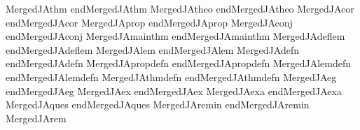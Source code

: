 \documentclass[12pt]{amsart}
\theoremstyle{definition}
\theoremstyle{remark}
\numberwithin{equation}{section}
\begin{document}
\newtheorem*{MergedJAclproof}{Proof of Claim}
\newtheorem*{MergedJAack}{Acknowledgements}



\expandafter\let\expandafter\thm\csname MergedJAthm\endcsname
\expandafter\let\expandafter\endthm\csname endMergedJAthm\endcsname
\expandafter\let\expandafter\theo\csname MergedJAtheo\endcsname
\expandafter\let\expandafter\endtheo\csname endMergedJAtheo\endcsname
\expandafter\let\expandafter\cor\csname MergedJAcor\endcsname
\expandafter\let\expandafter\endcor\csname endMergedJAcor\endcsname
\expandafter\let\expandafter\prop\csname MergedJAprop\endcsname
\expandafter\let\expandafter\endprop\csname endMergedJAprop\endcsname
\expandafter\let\expandafter\conj\csname MergedJAconj\endcsname
\expandafter\let\expandafter\endconj\csname endMergedJAconj\endcsname
\expandafter\let\expandafter\mainthm\csname MergedJAmainthm\endcsname
\expandafter\let\expandafter\endmainthm\csname endMergedJAmainthm\endcsname
\expandafter\let\expandafter\deflem\csname MergedJAdeflem\endcsname
\expandafter\let\expandafter\enddeflem\csname endMergedJAdeflem\endcsname
\expandafter\let\expandafter\lem\csname MergedJAlem\endcsname
\expandafter\let\expandafter\endlem\csname endMergedJAlem\endcsname
\expandafter\let\expandafter\defn\csname MergedJAdefn\endcsname
\expandafter\let\expandafter\enddefn\csname endMergedJAdefn\endcsname
\expandafter\let\expandafter\propdefn\csname MergedJApropdefn\endcsname
\expandafter\let\expandafter\endpropdefn\csname endMergedJApropdefn\endcsname
\expandafter\let\expandafter\lemdefn\csname MergedJAlemdefn\endcsname
\expandafter\let\expandafter\endlemdefn\csname endMergedJAlemdefn\endcsname
\expandafter\let\expandafter\thmdefn\csname MergedJAthmdefn\endcsname
\expandafter\let\expandafter\endthmdefn\csname endMergedJAthmdefn\endcsname
\expandafter\let\expandafter\eg\csname MergedJAeg\endcsname
\expandafter\let\expandafter\endeg\csname endMergedJAeg\endcsname
\expandafter\let\expandafter\ex\csname MergedJAex\endcsname
\expandafter\let\expandafter\endex\csname endMergedJAex\endcsname
\expandafter\let\expandafter\exa\csname MergedJAexa\endcsname
\expandafter\let\expandafter\endexa\csname endMergedJAexa\endcsname
\expandafter\let\expandafter\ques\csname MergedJAques\endcsname
\expandafter\let\expandafter\endques\csname endMergedJAques\endcsname
\expandafter\let\expandafter\remin\csname MergedJAremin\endcsname
\expandafter\let\expandafter\endremin\csname endMergedJAremin\endcsname
\expandafter\let\expandafter\rem\csname MergedJArem\endcsname
\end{document}
